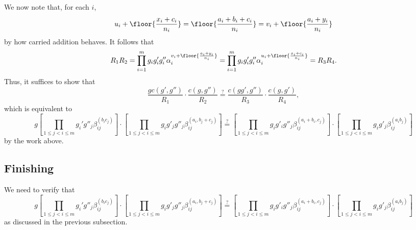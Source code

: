 We now note that, for each $i$,
\[u_i+\floor{\frac{x_i+c_i}{n_i}}=\floor{\frac{a_i+b_i+c_i}{n_i}}=v_i+\floor{\frac{a_i+y_i}{n_i}}\]
by how carried addition behaves. It follows that
\[R_1R_2=\prod_{i=1}^mg_ig'_ig''_i\alpha_i^{v_i+\floor{\frac{a_i+y_i}{n_i}}}=\prod_{i=1}^mg_ig'_ig''_i\alpha_i^{u_i+\floor{\frac{x_i+c_i}{n_i}}}=R_3R_4.\]
Thus, it suffices to show that
\[\frac{gc(g',g'')}{R_1}\cdot\frac{c(g,g'')}{R_2}\stackrel?=\frac{c(gg',g'')}{R_3}\cdot\frac{c(g,g')}{R_4},\]
which is equivalent to
\[g\left[\prod_{1\le j<i\le m}g_i'g''_j\beta_{ij}^{(b_ic_j)}\right]\cdot\left[\prod_{1\le j<i\le m}g_ig'_jg''_j\beta_{ij}^{(a_i,b_j+c_j)}\right]\stackrel?=\left[\prod_{1\le j<i\le m}g_ig'_ig''_j\beta_{ij}^{(a_i+b_i,c_j)}\right]\cdot\left[\prod_{1\le j<i\le m}g_ig'_j\beta_{ij}^{(a_ib_j)}\right]\]
by the work above.

\subsection{Finishing}
We need to verify that
\[g\left[\prod_{1\le j<i\le m}g_i'g''_j\beta_{ij}^{(b_ic_j)}\right]\cdot\left[\prod_{1\le j<i\le m}g_ig'_jg''_j\beta_{ij}^{(a_i,b_j+c_j)}\right]\stackrel?=\left[\prod_{1\le j<i\le m}g_ig'_ig''_j\beta_{ij}^{(a_i+b_i,c_j)}\right]\cdot\left[\prod_{1\le j<i\le m}g_ig'_j\beta_{ij}^{(a_ib_j)}\right]\]
as discussed in the previous subsection.

